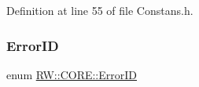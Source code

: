 Definition at line 55 of file Constans.\+h.

\hypertarget{namespace_r_w_1_1_c_o_r_e_adc31704b5171629bde8ad1b0badc49d4}{}\label{namespace_r_w_1_1_c_o_r_e_adc31704b5171629bde8ad1b0badc49d4} 
\subsubsection{\texorpdfstring{Error\+ID}{ErrorID}\hspace{0.1cm}{\footnotesize\ttfamily [2/2]}}
{\footnotesize\ttfamily enum \hyperlink{namespace_r_w_1_1_c_o_r_e_adc31704b5171629bde8ad1b0badc49d4}{R\+W\+::\+C\+O\+R\+E\+::\+Error\+ID}\hspace{0.3cm}{\ttfamily [strong]}}

